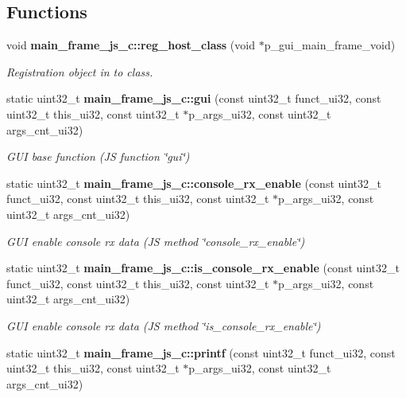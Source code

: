 \subsection*{Functions}
\begin{DoxyCompactItemize}
\item 
void \textbf{ main\+\_\+frame\+\_\+js\+\_\+c\+::reg\+\_\+host\+\_\+class} (void $\ast$p\+\_\+gui\+\_\+main\+\_\+frame\+\_\+void)
\begin{DoxyCompactList}\small\item\em Registration object in to class. \end{DoxyCompactList}\item 
static uint32\+\_\+t \textbf{ main\+\_\+frame\+\_\+js\+\_\+c\+::gui} (const uint32\+\_\+t funct\+\_\+ui32, const uint32\+\_\+t this\+\_\+ui32, const uint32\+\_\+t $\ast$p\+\_\+args\+\_\+ui32, const uint32\+\_\+t args\+\_\+cnt\+\_\+ui32)
\begin{DoxyCompactList}\small\item\em G\+UI base function (JS function \char`\"{}gui\char`\"{}) \end{DoxyCompactList}\item 
static uint32\+\_\+t \textbf{ main\+\_\+frame\+\_\+js\+\_\+c\+::console\+\_\+rx\+\_\+enable} (const uint32\+\_\+t funct\+\_\+ui32, const uint32\+\_\+t this\+\_\+ui32, const uint32\+\_\+t $\ast$p\+\_\+args\+\_\+ui32, const uint32\+\_\+t args\+\_\+cnt\+\_\+ui32)
\begin{DoxyCompactList}\small\item\em G\+UI enable console rx data (JS method \char`\"{}console\+\_\+rx\+\_\+enable\char`\"{}) \end{DoxyCompactList}\item 
static uint32\+\_\+t \textbf{ main\+\_\+frame\+\_\+js\+\_\+c\+::is\+\_\+console\+\_\+rx\+\_\+enable} (const uint32\+\_\+t funct\+\_\+ui32, const uint32\+\_\+t this\+\_\+ui32, const uint32\+\_\+t $\ast$p\+\_\+args\+\_\+ui32, const uint32\+\_\+t args\+\_\+cnt\+\_\+ui32)
\begin{DoxyCompactList}\small\item\em G\+UI enable console rx data (JS method \char`\"{}is\+\_\+console\+\_\+rx\+\_\+enable\char`\"{}) \end{DoxyCompactList}\item 
static uint32\+\_\+t \textbf{ main\+\_\+frame\+\_\+js\+\_\+c\+::printf} (const uint32\+\_\+t funct\+\_\+ui32, const uint32\+\_\+t this\+\_\+ui32, const uint32\+\_\+t $\ast$p\+\_\+args\+\_\+ui32, const uint32\+\_\+t args\+\_\+cnt\+\_\+ui32)

\end{DoxyCompactItemize}
